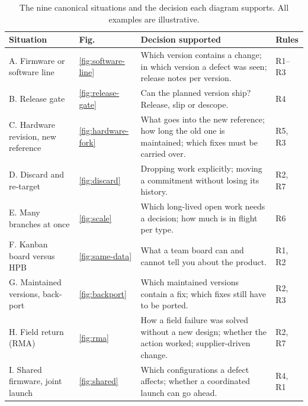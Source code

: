 \begin{table}[t]
  \centering
  \small
  \caption{The nine canonical situations and the decision each diagram
    supports. All examples are illustrative.}
  \label{tab:conditions}
  \renewcommand{\arraystretch}{1.1}
  \begin{tabularx}{\linewidth}{@{}>{\raggedright\arraybackslash}p{3.6cm}
      >{\centering\arraybackslash}p{0.7cm}
      >{\raggedright\arraybackslash}X
      >{\raggedright\arraybackslash}p{1.2cm}@{}}
    \toprule
    \textbf{Situation} & \textbf{Fig.} & \textbf{Decision supported}
      & \textbf{Rules} \\
    \midrule
    A. Firmware or software line
      & \ref{fig:software-line}
      & Which version contains a change; in which version a defect was
        seen; release notes per version.
      & R1--R3 \\
    B. Release gate
      & \ref{fig:release-gate}
      & Can the planned version ship? Release, slip or descope.
      & R4 \\
    C. Hardware revision, new reference
      & \ref{fig:hardware-fork}
      & What goes into the new reference; how long the old one is
        maintained; which fixes must be carried over.
      & R5, R3 \\
    D. Discard and re-target
      & \ref{fig:discard}
      & Dropping work explicitly; moving a commitment without losing its
        history.
      & R2, R7 \\
    E. Many branches at once
      & \ref{fig:scale}
      & Which long-lived open work needs a decision; how much is in
        flight per type.
      & R6 \\
    F. Kanban board versus HPB
      & \ref{fig:same-data}
      & What a team board can and cannot tell you about the product.
      & R1, R2 \\
    G. Maintained versions, back-port
      & \ref{fig:backport}
      & Which maintained versions contain a fix; which fixes still have to
        be ported.
      & R2, R3 \\
    H. Field return (RMA)
      & \ref{fig:rma}
      & How a field failure was solved without a new design; whether the
        action worked; supplier-driven change.
      & R2, R7 \\
    I. Shared firmware, joint launch
      & \ref{fig:shared}
      & Which configurations a defect affects; whether a coordinated
        launch can go ahead.
      & R4, R1 \\
    \bottomrule
  \end{tabularx}
\end{table}


